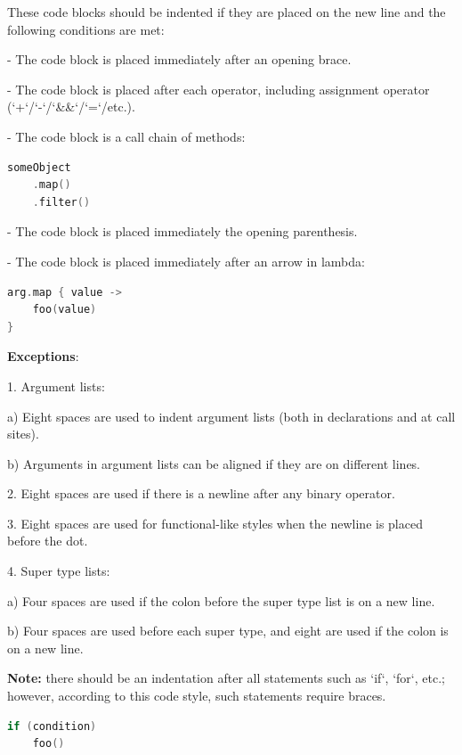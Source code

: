 These code blocks should be indented if they are placed on the new line and the following conditions are met:

-	The code block is placed immediately after an opening brace.

-	The code block is placed after each operator, including assignment operator (`+`/`-`/`\&\&`/`=`/etc.).

-	The code block is a call chain of methods:

\begin{lstlisting}[language=Kotlin]
someObject
    .map()
    .filter()
\end{lstlisting}
-  The code block is placed immediately the opening parenthesis.

-  The code block is placed immediately after an arrow in lambda:



\begin{lstlisting}[language=Kotlin]
arg.map { value ->
    foo(value)
}
\end{lstlisting}


\textbf{Exceptions}:

1.	Argument lists: \

a) Eight spaces are used to indent argument lists (both in declarations and at call sites). \

b) Arguments in argument lists can be aligned if they are on different lines.



2.	Eight spaces are used if there is a newline after any binary operator.



3.	Eight spaces are used for functional-like styles when the newline is placed before the dot.



4.	Super type lists: \

a) Four spaces are used if the colon before the super type list is on a new line. \

b) Four spaces are used before each super type, and eight are used if the colon is on a new line.



\textbf{Note:} there should be an indentation after all statements such as `if`, `for`, etc.; however, according to this code style, such statements require braces.



\begin{lstlisting}[language=Kotlin]
if (condition)
    foo()
\end{lstlisting}


